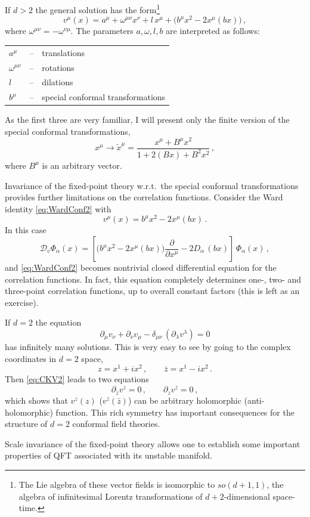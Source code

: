 If $d>2$ the general solution has the form\footnote{The Lie algebra of these vector
fields is isomorphic to $so(d+1,1)$, the algebra of infinitesimal Lorentz
transformations of $d+2$-dimensional space-time.}
\[
v^\mu(x)=a^\mu+\omega^{\mu\nu}x^\nu+l\,x^\mu+\bigl(b^\mu x^2-2x^\mu(bx)\bigr)\,,
\]
where $\omega^{\mu\nu}=-\omega^{\nu\mu}$. The parameters $a,\omega,l,b$ are
interpreted as follows:
\begin{center}
\begin{tabular}{lll}
$a^\mu$ & -- & translations\\
$\omega^{\mu\nu}$ & -- & rotations\\
$l$ & -- & dilations\\
$b^\mu$ & -- & special conformal transformations
\end{tabular}
\end{center}
As the first three are very familiar, I will present only the finite version of the
special conformal transformations,
\[
x^\mu\to\tilde x^\mu=\frac{x^\mu+B^\mu x^2}{1+2(Bx)+B^2x^2}\,,
\]
where $B^\mu$ is an arbitrary vector.

Invariance of the fixed-point theory w.r.t.\ the special conformal transformations
provides further limitations on the correlation functions. Consider the Ward
identity \eqref{eq:WardConf2} with
\[
v^\mu(x)=b^\mu x^2-2x^\mu(bx)\,.
\]
In this case
\[
\mathcal D_v\Phi_\alpha(x)=\left[\bigl(b^\mu x^2-2x^\mu(bx)\bigr)\frac\partial{\partial x^\mu}-2D_\alpha\,(bx)\right]\,\Phi_\alpha(x)\,,
\]
and \eqref{eq:WardConf2} becomes nontrivial closed differential equation for the
correlation functions. In fact, this equation completely determines one-, two- and
three-point correlation functions, up to overall constant factors (this is left as
an exercise).

If $d=2$ the equation
\begin{equation}\label{eq:CKV2}
\partial_\mu v_\nu+\partial_\nu v_\mu-\delta_{\mu\nu}\,(\partial_\lambda v^\lambda)=0
\end{equation}
has infinitely many solutions. This is very easy to see by going to the complex
coordinates in $d=2$ space,
\[
z=x^1+ix^2\,,\qquad\bar z=x^1-ix^2\,.
\]
Then \eqref{eq:CKV2} leads to two equations
\[
\partial_{\bar z}v^z=0\,,\qquad\partial_zv^{\bar z}=0\,,
\]
which shows that $v^z(z)$ ($v^{\bar z}(\bar z)$) can be arbitrary holomorphic
(anti-holomorphic) function. This rich symmetry has important consequences for
the structure of $d=2$ conformal field theories.

Scale invariance of the fixed-point theory allows one to establish some important
properties of QFT associated with its unstable manifold.

